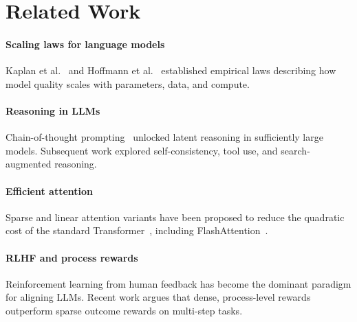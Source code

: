 \section{Related Work}
\label{sec:related}

\paragraph{Scaling laws for language models}
Kaplan et al.~\citep{kaplan2020scaling} and Hoffmann et
al.~\citep{hoffmann2022chinchilla} established empirical laws describing how
model quality scales with parameters, data, and compute.

\paragraph{Reasoning in LLMs}
Chain-of-thought prompting~\citep{wei2022cot} unlocked latent reasoning in
sufficiently large models. Subsequent work explored self-consistency, tool
use, and search-augmented reasoning.

\paragraph{Efficient attention}
Sparse and linear attention variants have been proposed to reduce the
quadratic cost of the standard Transformer~\citep{vaswani2017attention},
including FlashAttention~\citep{dao2022flashattention}.

\paragraph{RLHF and process rewards}
Reinforcement learning from human feedback has become the dominant paradigm
for aligning LLMs. Recent work argues that dense, process-level rewards
outperform sparse outcome rewards on multi-step tasks.
